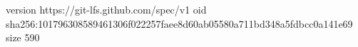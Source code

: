 version https://git-lfs.github.com/spec/v1
oid sha256:101796308589461306f022257faee8d60ab05580a711bd348a5fdbcc0a141e69
size 590
